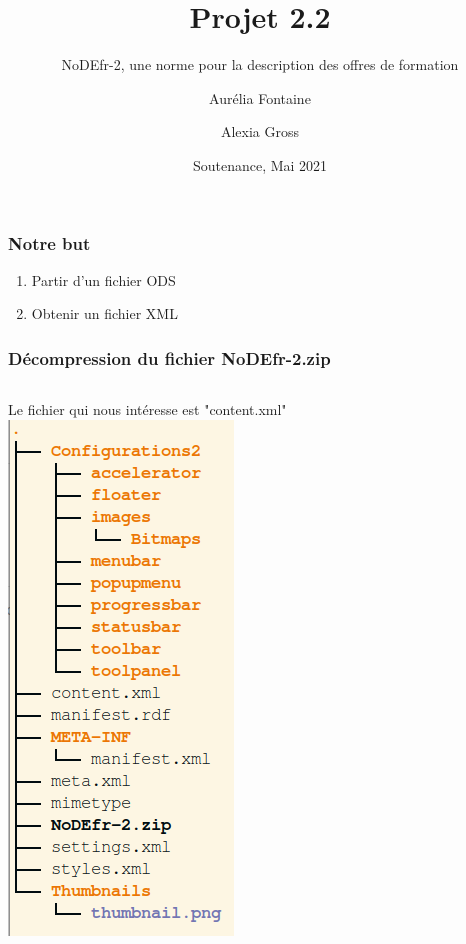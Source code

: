 \documentclass{beamer}
\title[Projet 2.2] %
{Projet 2.2}
\subtitle{NoDEfr-2, une norme pour la description des offres de formation}
\author{Aurélia Fontaine \and Alexia Gross}
\date %
{Soutenance, Mai 2021}
\begin{document}
\frame{\titlepage}


\begin{frame}
\frametitle{Notre but}

\begin{enumerate}
 \item Partir d'un fichier ODS
 \item Obtenir un fichier XML
\end{enumerate}
\end{frame}

\begin{frame}
\frametitle{Décompression du fichier NoDEfr-2.zip}
\begin{columns}
Le fichier qui nous intéresse est "content.xml"
\includegraphics[scale=0.4]{arborescence.png}
\end{columns}
\end{frame}
\end{document}
